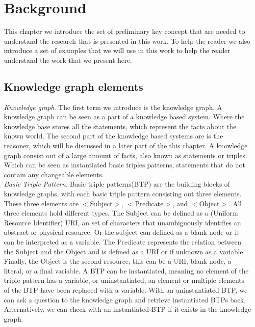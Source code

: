 \documentclass{article}
\begin{document}
\newpage
\section{Background}
This chapter we introduce the set of preliminary key concept that are needed to understand the research that is presented in this work. To help the reader we also introduce a set of examples that we will use in this work to help the reader understand the work that we present here.

\subsection{Knowledge graph elements}\label{graphElements}
\textit{Knowledge graph}. The first term we introduce is the knowledge graph. A knowledge graph can be seen as a part of a knowledge based system. Where the knowledge base stores all the statements, which represent the facts about the known world. The second part of the knowledge based systems are is the reasoner, which will be discussed in a later part of the this chapter. A knowledge graph consist out of a large amount of facts, also known as statements or triples. Which can be seen as instantiated basic triples patterns, statements that do not contain any changeable elements.\\

\textit{Basic Triple Pattern}. Basic triple patterns(BTP) are the building blocks of knowledge graphs, with each basic triple pattern consisting out three elements.
These three elements are $<$Subject$>$, $<$Predicate$>$, and $<$Object$>$. All three elements hold different types. The Subject can be defined as a (Uniform Resource Identifier) URI, an set of characters that unambiguously identifies an abstract or physical resource. Or the subject can defined as a blank node or it can be interpreted as a variable. The Predicate represents the relation between the Subject and the Object and is defined as a URI or if unknown as a variable. Finally, the Object is the second resource; this can be a URI, blank node, a literal, or a final variable. A BTP can be instantiated, meaning no element of the triple pattern has a variable, or uninstantiated, an element or multiple elements of the BTP have been replaced with a variable. With an uninstantiated BTP, we can ask a question to the knowledge graph and retrieve instantiated BTPs back. Alternatively, we can check with an instantiated BTP if it exists in the knowledge graph.\\
\end{document}
